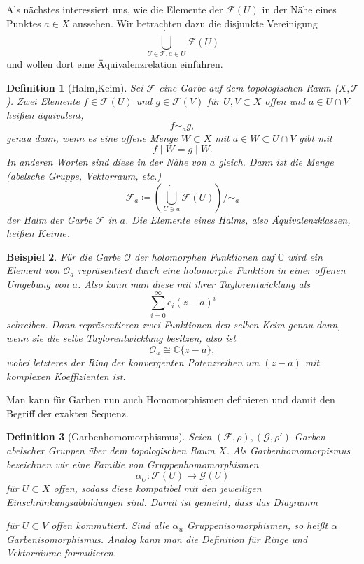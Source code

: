 \documentclass[11pt,a4paper,toc=bibliography]{scrartcl}
\theoremstyle{def}
\newtheorem{defi}{Definition}[section]
\theoremstyle{thm}
\newtheorem{bsp}[defi]{Beispiel}
\theoremstyle{remark}
\begin{document}
Als nächstes interessiert uns, wie die Elemente der $\mathcal{F}(U)$ in der Nähe eines Punktes $a\in X$ aussehen. Wir betrachten dazu die disjunkte Vereinigung
\[
\dot{\bigcup_{U\in \mathcal{T},a\in U}} \mathcal{F}(U)
\]
und wollen dort eine Äquivalenzrelation einführen.
\begin{defi}[Halm,Keim]
Sei $\mathcal{F}$ eine Garbe auf dem topologischen Raum ($X,\mathcal{T}$). Zwei Elemente $f\in\mathcal{F}(U)$ und $g\in \mathcal{F}(V)$ für $U,V\subset X$ offen und $a\in U\cap V$ heißen äquivalent,
\[
f\sim_a g,
\]
genau dann, wenn es eine offene Menge $W\subset X$ mit $a\in W\subset U\cap V$ gibt mit
\[
f\mid W = g\mid W.
\]
In anderen Worten sind diese in der Nähe von $a$ gleich. Dann ist die Menge (abelsche Gruppe, Vektorraum, etc.)
\[
\mathcal{F}_a \coloneqq \left( \dot{\bigcup_{U\ni a}} \mathcal{F}(U) \right) /\sim_a
\]
der \emph{Halm} der Garbe $\mathcal{F}$ in $a$. Die Elemente eines Halms, also Äquivalenzklassen, heißen $Keime$.
\end{defi}
\begin{bsp}
Für die Garbe $\mathcal{O}$ der holomorphen Funktionen auf $\mathbb{C}$ wird ein Element von $\mathcal{O}_a$ repräsentiert durch eine holomorphe Funktion in einer offenen Umgebung von $a$. Also kann man diese mit ihrer Taylorentwicklung als
\[
\sum_{i=0}^{\infty} c_i(z-a)^i
\]
schreiben. Dann repräsentieren zwei Funktionen den selben Keim genau dann, wenn sie die selbe Taylorentwicklung besitzen, also ist 
\[
\mathcal{O}_a \cong \mathbb{C}\{ z-a \},
\]
wobei letzteres der Ring der konvergenten Potenzreihen um $(z-a)$ mit komplexen Koeffizienten ist.
\end{bsp}

Man kann für Garben nun auch Homomorphismen definieren und damit den Begriff der exakten Sequenz.

\begin{defi}[Garbenhomomorphismus]
Seien $(\mathcal{F},\rho),(\mathcal{G},\rho')$ Garben abelscher Gruppen über dem topologischen Raum $X$. 
Als \emph{Garbenhomomorpismus} bezeichnen wir eine Familie von Gruppenhomomorphismen 
\[
\alpha_U :\mathcal{F}(U)\rightarrow \mathcal{G}(U)
\]
für $U\subset X$ offen, sodass diese kompatibel mit den jeweiligen Einschränkungsabbildungen sind. 
Damit ist gemeint, dass das Diagramm
\begin{center}
\end{center}
für $U\subset V$ offen kommutiert. 
Sind alle $\alpha_u$ Gruppenisomorphismen, so heißt $\alpha$ \emph{Garbenisomorphismus}. 
Analog kann man die Definition für Ringe und Vektorräume formulieren.
\end{defi}
\end{document}
